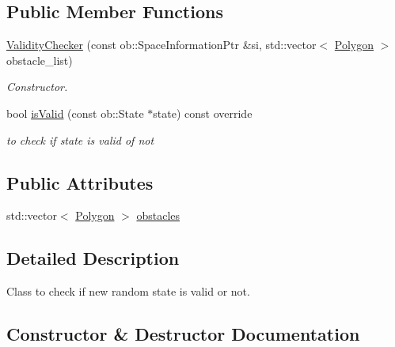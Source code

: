 \subsection*{Public Member Functions}
\begin{DoxyCompactItemize}
\item 
\hyperlink{classValidityChecker_ada15197ab56e9e0002e2b11ccac01253}{Validity\+Checker} (const ob\+::\+Space\+Information\+Ptr \&si, std\+::vector$<$ \hyperlink{utils_8hpp_a18281038c49470960bd8f4d15b893441}{Polygon} $>$ obstacle\+\_\+list)
\begin{DoxyCompactList}\small\item\em Constructor. \end{DoxyCompactList}\item 
bool \hyperlink{classValidityChecker_aed770a601b4856c6f055a70ea752be37}{is\+Valid} (const ob\+::\+State $\ast$state) const override
\begin{DoxyCompactList}\small\item\em to check if state is valid of not \end{DoxyCompactList}\end{DoxyCompactItemize}
\subsection*{Public Attributes}
\begin{DoxyCompactItemize}
\item 
std\+::vector$<$ \hyperlink{utils_8hpp_a18281038c49470960bd8f4d15b893441}{Polygon} $>$ \hyperlink{classValidityChecker_a3680b7a8c6e1d6dbaf7833df9f86ce84}{obstacles}
\end{DoxyCompactItemize}


\subsection{Detailed Description}
Class to check if new random state is valid or not. 

\subsection{Constructor \& Destructor Documentation}

